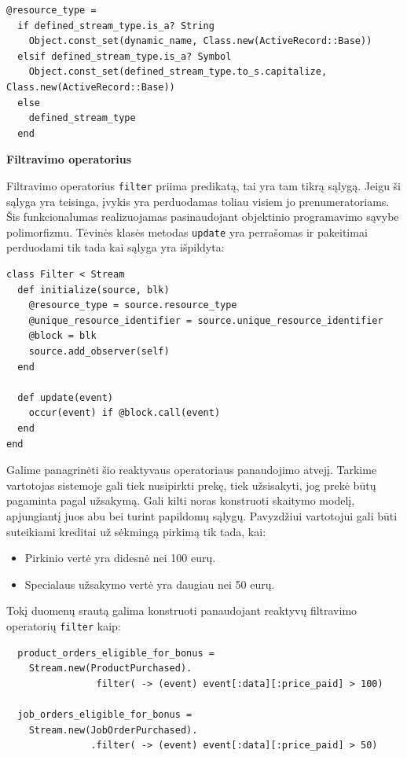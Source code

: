 \begin{lstlisting}
@resource_type =
  if defined_stream_type.is_a? String
    Object.const_set(dynamic_name, Class.new(ActiveRecord::Base))
  elsif defined_stream_type.is_a? Symbol
    Object.const_set(defined_stream_type.to_s.capitalize, Class.new(ActiveRecord::Base))
  else
    defined_stream_type
  end
\end{lstlisting}

\textbf{Filtravimo operatorius}

Filtravimo operatorius \lstinline|filter| priima predikatą, tai yra tam tikrą sąlygą. Jeigu ši sąlyga yra teisinga, įvykis yra perduodamas toliau visiem jo prenumeratoriams. Šis funkcionalumas realizuojamas pasinaudojant objektinio programavimo sąvybe polimorfizmu. Tėvinės klasės metodas \lstinline|update| yra perrašomas ir pakeitimai perduodami tik tada kai sąlyga yra išpildyta:

\begin{lstlisting}
class Filter < Stream
  def initialize(source, blk)
    @resource_type = source.resource_type
    @unique_resource_identifier = source.unique_resource_identifier
    @block = blk
    source.add_observer(self)
  end

  def update(event)
    occur(event) if @block.call(event)
  end
end
\end{lstlisting}

Galime panagrinėti šio reaktyvaus operatoriaus panaudojimo atvejį. Tarkime vartotojas sistemoje gali tiek nusipirkti prekę, tiek užsisakyti, jog prekė būtų pagaminta pagal užsakymą. Gali kilti noras konstruoti skaitymo modelį, apjungiantį juos abu bei turint papildomų sąlygų. Pavyzdžiui vartotojui gali būti suteikiami kreditai už sėkmingą pirkimą tik tada, kai:

\begin{itemize}
  \item Pirkinio vertė yra didesnė nei 100 eurų.
  \item Specialaus užsakymo vertė yra daugiau nei 50 eurų.
\end{itemize}

Tokį duomenų srautą galima konstruoti panaudojant reaktyvų filtravimo operatorių \lstinline|filter| kaip:

\begin{lstlisting}
  product_orders_eligible_for_bonus =
    Stream.new(ProductPurchased).
                filter( -> (event) event[:data][:price_paid] > 100)

  job_orders_eligible_for_bonus =
    Stream.new(JobOrderPurchased).
               .filter( -> (event) event[:data][:price_paid] > 50)
\end{lstlisting}


